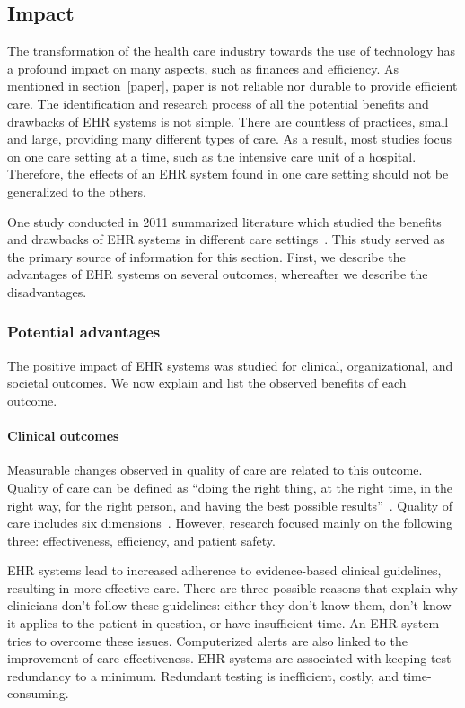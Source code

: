    \subsection{Impact}\label{impact_ehrs}

    The transformation of the health care industry towards the use of technology has a profound impact on many aspects, such as finances and efficiency. As mentioned in section~\ref{paper}, paper is not reliable nor durable to provide efficient care. The identification and research process of all the potential benefits and drawbacks of EHR systems is not simple. There are countless of practices, small and large, providing many different types of care. As a result, most studies focus on one care setting at a time, such as the intensive care unit of a hospital. Therefore, the effects of an EHR system found in one care setting should not be generalized to the others.

    One study conducted in 2011 summarized literature which studied the benefits and drawbacks of EHR systems in different care settings~\cite{Menachemi2011}. This study served as the primary source of information for this section. First, we describe the advantages of EHR systems on several outcomes, whereafter we describe the disadvantages.

        \subsubsection{Potential advantages}\label{ehrs_advantages}

        The positive impact of EHR systems was studied for clinical, organizational, and societal outcomes. We now explain and list the observed benefits of each outcome.

        \paragraph{Clinical outcomes} Measurable changes observed in quality of care are related to this outcome. Quality of care can be defined as ``doing the right thing, at the right time, in the right way, for the right person, and having the best possible results''~\cite{AHRQ2001}. Quality of care includes six dimensions~\cite{CTQC2001}. However, research focused mainly on the following three: effectiveness, efficiency, and patient safety.

        EHR systems lead to increased adherence to evidence-based clinical guidelines, resulting in more effective care. There are three possible reasons that explain why clinicians don't follow these guidelines: either they don't know them, don't know it applies to the patient in question, or have insufficient time. An EHR system tries to overcome these issues. Computerized alerts are also linked to the improvement of care effectiveness. EHR systems are associated with keeping test redundancy to a minimum. Redundant testing is inefficient, costly, and time-consuming. 

